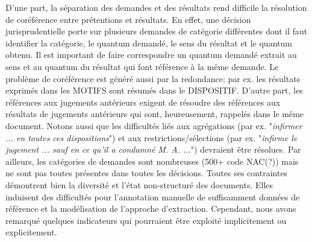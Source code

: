 D'une part, la séparation des demandes et des résultats rend difficile la résolution de coréférence entre prétentions et résultats. En effet, une décision jurisprudentielle porte sur plusieurs demandes de catégorie différentes dont il faut identifier la catégorie, le quantum demandé, le sens du résultat et le quantum obtenu. Il est important de faire correspondre un quantum demandé extrait au sens et au quantum du résultat qui font référence à la même demande. Le problème de coréférence est généré aussi par la redondance; par ex. les résultats exprimés dans les MOTIFS sont résumés dans le DISPOSITIF. D'autre part, les références aux jugements antérieurs exigent de résoudre des références aux résultats de jugements antérieurs qui sont, heureusement, rappelés dans le même document. Notons aussi que les difficultés liés aux agrégations (par ex. "\textit{infirmer ... en toutes ces dispositions}") et aux restrictions/sélections (par ex. "\textit{infirme le jugement ... sauf en ce qu'il a condamné M. A. ...}") devraient être résolues. Par ailleurs, les catégories de demandes sont nombreuses (500+ code NAC(?)) mais ne sont pas toutes présentes dans toutes les décisions. Toutes ses contraintes démontrent bien la diversité et l'état non-structuré des documents. Elles induisent des difficultés pour l'annotation manuelle de suffisamment données de référence et la modélisation de l'approche d'extraction. Cependant, nous avons remarqué quelques indicateurs qui pourraient être exploité implicitement ou explicitement.

